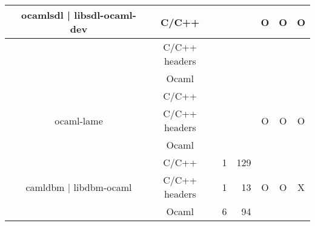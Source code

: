 \documentclass[11pt,a4paper]{article}
\begin{document}
\begin{table}[h,t]
\begin{tabular}{|>{\centering}m{3cm}| c|c|r|r| c| c|c|}
 &\multirow{3}{3cm}{ocamlsdl | libsdl-ocaml-dev} & C/C++ &  &  & \multirow{3}{*}{O} & \multirow{3}{*}{O} & \multirow{3}{*}{O}\\
 \cline{3-5}
 & &                           C/C++ headers &  &  & & & \\
 \cline{3-5}
 & &                          Ocaml &  &  & & & \\
 \cline{2-8}



 &\multirow{3}{*}{ocaml-lame} & C/C++ &  &  & \multirow{3}{*}{O} & \multirow{3}{*}{O} & \multirow{3}{*}{O}\\
 \cline{3-5}
 & &                           C/C++ headers &  &  & & & \\
 \cline{3-5}
 & &                          Ocaml &  &  & & & \\
 \cline{2-8}

 &\multirow{3}{3cm}{camldbm | libdbm-ocaml} & C/C++ & 1 & 129 & \multirow{3}{*}{O} & \multirow{3}{*}{O} & \multirow{3}{*}{X}\\
\cline{3-5}
& &                           C/C++ headers & 1 & 13 & & & \\
\cline{3-5}
& &                          Ocaml & 6 & 94 & & & \\
\hline

\end{tabular}
\end{table}
\end{document}
